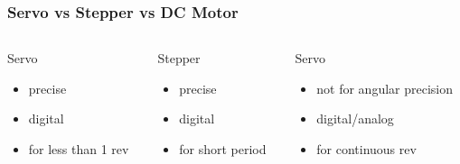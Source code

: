 \documentclass[compress, aspectratio=32]{beamer}
\begin{document}
\begin{frame}
    \frametitle{Servo vs Stepper vs DC Motor}
    \begin{columns}
        \begin{column}[]{0.3\textwidth}
            Servo
            \begin{itemize}
                \item precise
                \item digital
                \item for less than 1 rev
            \end{itemize}
        \end{column}
        \begin{column}[]{0.3\textwidth}
            Stepper
            \begin{itemize}
                \item precise
                \item digital
                \item for short period
            \end{itemize}
        \end{column}
        \begin{column}[]{0.3\textwidth}
            Servo
            \begin{itemize}
                \item not for angular precision
                \item digital/analog
                \item for continuous rev
            \end{itemize}
        \end{column}
    \end{columns}
\end{frame}
\end{document}
